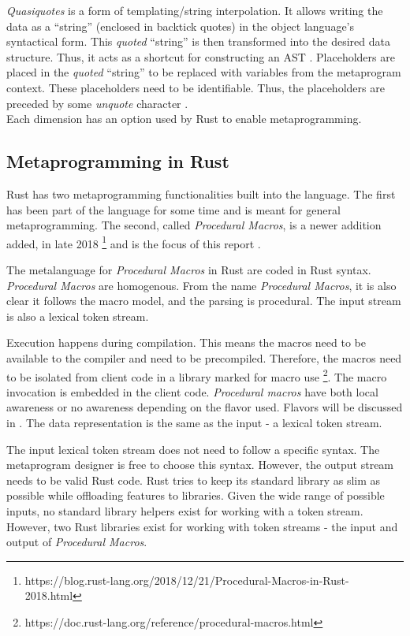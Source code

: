 \textit{Quasiquotes} is a form of templating/string interpolation.
It allows writing the data as a ``string'' (enclosed in backtick quotes) in the object language's syntactical form.
This \textit{quoted} ``string'' is then transformed into the desired data structure.
Thus, it acts as a shortcut for constructing an AST \cite{lilis_15_01}.
Placeholders are placed in the \textit{quoted} ``string'' to be replaced with variables from the metaprogram context.
These placeholders need to be identifiable.
Thus, the placeholders are preceded by some \textit{unquote} character \cite{bawden_99_01}.\\

Each dimension has an option used by Rust to enable metaprogramming.

\subsection{Metaprogramming in Rust}
Rust has two metaprogramming functionalities built into the language.
The first has been part of the language for some time and is meant for general metaprogramming.
The second, called \textit{Procedural Macros}, is a newer addition added, in late 2018 \footnote{https://blog.rust-lang.org/2018/12/21/Procedural-Macros-in-Rust-2018.html} and is the focus of this report \cite{klabnik_2019_01}.

The metalanguage for \textit{Procedural Macros} in Rust are coded in Rust syntax.
\textit{Procedural Macros} are homogenous.
From the name \textit{Procedural Macros}, it is also clear it follows the macro model, and the parsing is procedural.
The input stream is also a lexical token stream.

Execution happens during compilation.
This means the macros need to be available to the compiler and need to be precompiled.
Therefore, the macros need to be isolated from client code in a library marked for macro use \footnote{https://doc.rust-lang.org/reference/procedural-macros.html}.
The macro invocation is embedded in the client code.
\textit{Procedural macros} have both local awareness or no awareness depending on the flavor used.
Flavors will be discussed in .
The data representation is the same as the input - a lexical token stream.

The input lexical token stream does not need to follow a specific syntax.
The metaprogram designer is free to choose this syntax.
However, the output stream needs to be valid Rust code.
Rust tries to keep its standard library as slim as possible while offloading features to libraries.
Given the wide range of possible inputs, no standard library helpers exist for working with a token stream.
However, two Rust libraries exist for working with token streams - the input and output of \textit{Procedural Macros}.

